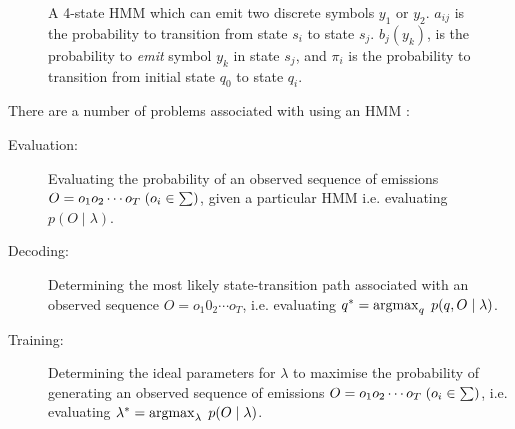 \begin{figure}[htbp]
\begin{center}
\end{center}
\caption{A 4-state HMM which can emit two discrete symbols $y_1$ or $y_2$. $a_{ij}$ is the probability to transition from state $s_i$ to state $s_j$. $b_j(y_k)$, is the probability to \textit{emit} symbol $y_k$ in state $s_j$, and $\pi_i$ is the probability to transition from initial state $q_0$ to state $q_i$.}
\end{figure}


There are a number of problems associated with using an HMM \cite{zhai2003brief}:

\begin{description}
	\item[Evaluation:]{Evaluating the probability of an observed sequence of emissions $O = o_1 o_2 \cdots o_T \hspace{1mm} (o_i \in \sum\limits)$, given a particular HMM i.e. evaluating $p(O \mid \lambda)$.}
	\item[Decoding:]{Determining the most likely state-transition path associated with an observed sequence $O = o_1 0_2 \cdots o_T$, i.e. evaluating $q^{*} = \operatorname*{argmax}_{q} \hspace{1mm} p(q, O \mid \lambda)$.}
	\item[Training:]{Determining the ideal parameters for $\lambda$ to maximise the probability of generating an observed sequence of emissions $O = o_1 o_2 \cdots o_T \hspace{1mm} (o_i \in \sum\limits)$, i.e. evaluating $\lambda^{*} = \operatorname*{argmax}_{\lambda} \hspace{1mm} p(O \mid \lambda)$.}
\end{description}

